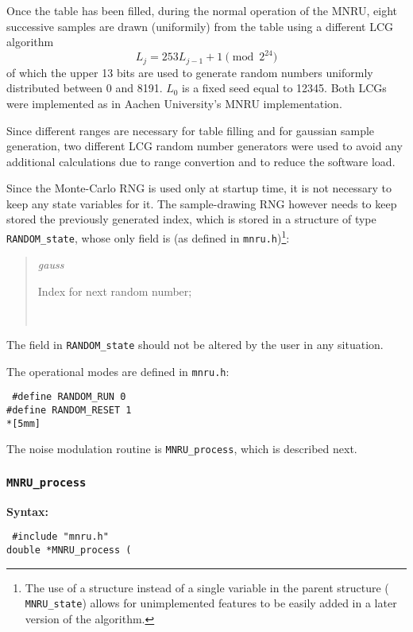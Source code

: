 Once the table has been filled, during the normal operation of the
MNRU, eight successive samples are drawn (uniformily) from the table
using a different LCG algorithm
\[
            L_{j} = 253 L_{j-1} + 1 \pmod{2^{24}}
\]
of which the upper 13 bits are used to generate random numbers
uniformly distributed between 0 and 8191. $L_0$ is a fixed seed equal
to 12345. Both LCGs were implemented as in Aachen University's MNRU
implementation.

Since different ranges are necessary for table filling and for
gaussian sample generation, two different LCG random number generators
were used to avoid any additional calculations due to range convertion
and to reduce the software load.

Since the Monte-Carlo RNG is used only at startup time, it is not
necessary to keep any state variables for it. The sample-drawing RNG
however needs to keep stored the previously generated index, which is
stored in a structure of type {\tt RANDOM\_state}, whose only field
is (as defined in {\tt mnru.h})\footnote{\SF The use of a structure
instead of a single variable in the parent structure ({\tt
MNRU\_state}) allows for unimplemented features to be easily added in
a later version of the algorithm.}:
\begin{quote} \normalsize
 {\em gauss}    \hfill \parbox{100mm}{\SF Index for next random number;}\\
\end{quote}

The field in {\tt RANDOM\_state} should not be altered by the user in
any situation.

The operational modes are defined in {\tt mnru.h}:

 \parbox[t]{120mm}{\tt
\#define RANDOM\_RUN 0\\
\#define RANDOM\_RESET 1\\*[5mm]
}

The noise modulation routine is {\tt MNRU\_process}, which is described
next.

\subsubsection{{\tt MNRU\_process}}

{\bf Syntax: }

{\tt
\#include "mnru.h"\\
double *MNRU\_process (
}

